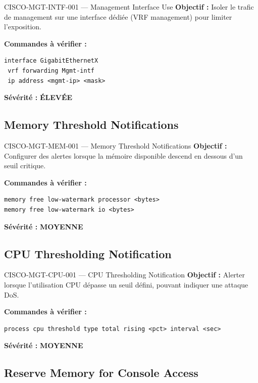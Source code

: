 \documentclass[12pt, a4paper]{report}
\begin{document}
\begin{rulebox}{CISCO-MGT-INTF-001 — Management Interface Use}
  \textbf{Objectif :} Isoler le trafic de management sur une interface dédiée (VRF management) pour limiter l'exposition.

  \textbf{Commandes à vérifier :}
  \begin{lstlisting}
interface GigabitEthernetX
 vrf forwarding Mgmt-intf
 ip address <mgmt-ip> <mask>
  \end{lstlisting}

  \textbf{Sévérité :} \textcolor{accentOrange}{\textbf{ÉLEVÉE}}
\end{rulebox}

\subsection{Memory Threshold Notifications}

\begin{rulebox}{CISCO-MGT-MEM-001 — Memory Threshold Notifications}
  \textbf{Objectif :} Configurer des alertes lorsque la mémoire disponible descend en dessous d'un seuil critique.

  \textbf{Commandes à vérifier :}
  \begin{lstlisting}
memory free low-watermark processor <bytes>
memory free low-watermark io <bytes>
  \end{lstlisting}

  \textbf{Sévérité :} \textcolor{accentGreen}{\textbf{MOYENNE}}
\end{rulebox}

\subsection{CPU Thresholding Notification}

\begin{rulebox}{CISCO-MGT-CPU-001 — CPU Thresholding Notification}
  \textbf{Objectif :} Alerter lorsque l'utilisation CPU dépasse un seuil défini, pouvant indiquer une attaque DoS.

  \textbf{Commandes à vérifier :}
  \begin{lstlisting}
process cpu threshold type total rising <pct> interval <sec>
  \end{lstlisting}

  \textbf{Sévérité :} \textcolor{accentGreen}{\textbf{MOYENNE}}
\end{rulebox}

\subsection{Reserve Memory for Console Access}
\end{document}
